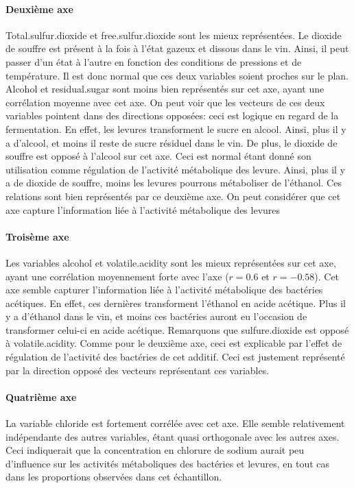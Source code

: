 \documentclass[11pt,a4paper]{article}
\begin{document}
\paragraph{Deuxième axe}Total.sulfur.dioxide et free.sulfur.dioxide sont les mieux représentées. Le dioxide de souffre est présent à la fois à l'état gazeux et dissous dans le vin. Ainsi, il peut passer d'un état à l'autre en fonction des conditions de pressions et de température. Il est donc normal que ces deux variables soient proches sur le plan. Alcohol et residual.sugar sont moins bien représentés sur cet axe, ayant une corrélation moyenne avec cet axe. On peut voir que les vecteurs de ces deux variables pointent dans des directions opposées: ceci est logique en regard de la fermentation. En effet, les levures transforment le sucre en alcool. Ainsi, plus il y a d'alcool, et moins il reste de sucre résiduel dans le vin. De plus, le dioxide de souffre est opposé à l'alcool sur cet axe. Ceci est normal étant donné son utilisation comme régulation de l'activité métabolique des levure. Ainsi, plus il y a de dioxide de souffre, moins les levures pourrons métaboliser de l'éthanol. Ces relations sont bien représentés par ce deuxième axe. On peut considérer que cet axe capture l'information liée à l'activité métabolique des levures

\paragraph{Troisème axe}Les variables alcohol et volatile.acidity sont les mieux représentées sur cet axe, ayant une corrélation moyennement forte avec l'axe ($r=0.6$ et $r=-0.58$). Cet axe semble capturer l'information liée à l'activité métabolique des bactéries acétiques. En effet, ces dernières transforment l'éthanol en acide acétique. Plus il y a d'éthanol dans le vin, et moins ces bactéries auront eu l'occasion de transformer celui-ci en acide acétique. Remarquons que sulfure.dioxide est opposé à volatile.acidity. Comme pour le deuxième axe, ceci est explicable par l'effet de régulation de l'activité des bactéries de cet additif. Ceci est justement représenté par la direction opposé des vecteurs représentant ces variables.

\paragraph{Quatrième axe}La variable chloride est fortement corrélée avec cet axe. Elle semble relativement indépendante des autres variables, étant quasi orthogonale avec les autres axes. Ceci indiquerait que la concentration en chlorure de sodium aurait peu d'influence sur les activités métaboliques des bactéries et levures, en tout cas dans les proportions observées dans cet échantillon.
\end{document}
